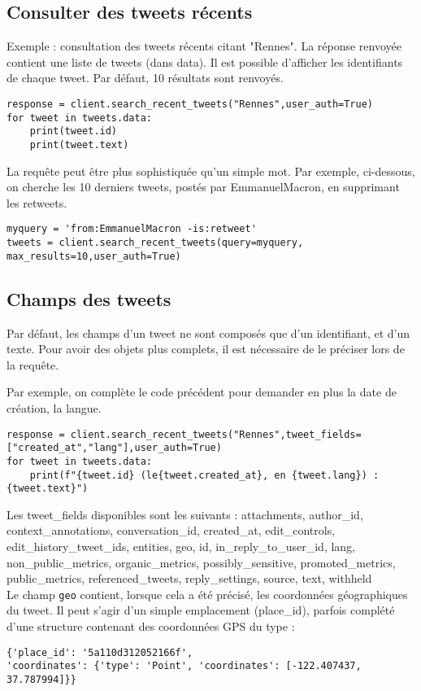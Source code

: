 \documentclass[11pt,a4paper]{article}
\begin{document}
\subsection{Consulter des tweets récents}
Exemple : consultation des tweets récents citant "Rennes". La réponse renvoyée contient une liste de tweets (dans data). Il est possible d'afficher les identifiants de chaque tweet. Par défaut, 10 résultats sont renvoyés. 
\begin{lstlisting}
response = client.search_recent_tweets("Rennes",user_auth=True)
for tweet in tweets.data:
    print(tweet.id)
    print(tweet.text)
\end{lstlisting}  

La requête peut être plus sophistiquée qu'un simple mot. 
Par exemple, ci-dessous, on cherche les 10 derniers tweets, postés par EmmanuelMacron, en supprimant les retweets.
\begin{lstlisting}
myquery = 'from:EmmanuelMacron -is:retweet'
tweets = client.search_recent_tweets(query=myquery, max_results=10,user_auth=True)
\end{lstlisting}                                    
\subsection{Champs des tweets}

Par défaut, les champs d'un tweet ne sont composés que d'un identifiant, et d'un texte. Pour avoir des objets plus complets, il est nécessaire de le préciser lors de la requête. 

Par exemple, on complète le code précédent pour demander en plus la date de création, la langue.
\begin{lstlisting}
response = client.search_recent_tweets("Rennes",tweet_fields=["created_at","lang"],user_auth=True)
for tweet in tweets.data:
    print(f"{tweet.id} (le{tweet.created_at}, en {tweet.lang}) : {tweet.text}") 
\end{lstlisting} 

Les tweet\_fields disponibles sont les suivants : 
attachments, author\_id, context\_annotations, conversation\_id, created\_at, edit\_controls, edit\_history\_tweet\_ids, entities, geo, id, in\_reply\_to\_user\_id, lang, non\_public\_metrics, organic\_metrics, possibly\_sensitive, promoted\_metrics, public\_metrics, referenced\_tweets, reply\_settings, source, text, withheld
\\

Le champ \verb+geo+ contient, lorsque cela a été précisé, les coordonnées géographiques du tweet. 
Il peut s'agir d'un simple emplacement (place\_id), parfois complété d'une structure contenant des coordonnées GPS du type : 
\begin{verbatim}
{'place_id': '5a110d312052166f', 
'coordinates': {'type': 'Point', 'coordinates': [-122.407437, 37.787994]}}
\end{verbatim}
\\
\end{document}
